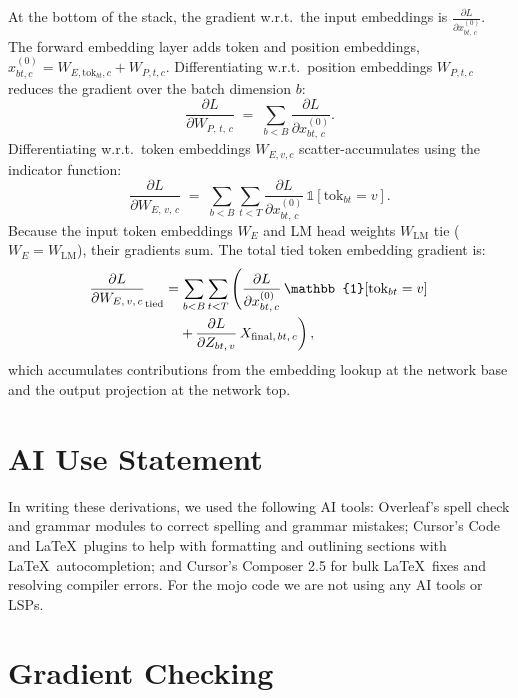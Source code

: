 \documentclass[letterpaper, 10 pt, conference]{ieeeconf}
\newcommand{\pdv}[2]{\frac{\partial #1}{\partial #2}}
\newcommand{\dL}[1]{\pdv{L}{#1}}
\newcommand{\ind}[1]{\mathbb{1}\!\left[#1\right]}
\theoremstyle{definition}
\begin{document}
At the bottom of the stack, the gradient w.r.t.\ the input embeddings is $\dL{x^{(0)}_{bt,\, c}}$. The forward embedding layer adds token and position embeddings, $x^{(0)}_{bt, c} = W_{E, \text{tok}_{bt}, c} + W_{P, t, c}$.
Differentiating w.r.t.\ position embeddings $W_{P, t, c}$ reduces the gradient over the batch dimension $b$:
\begin{equation}
  \dL{W_{P,\, t,\, c}} \;=\; \sum_{b<B} \dL{x^{(0)}_{bt,\, c}}.
  \label{eq:full-dwp}
\end{equation}
Differentiating w.r.t.\ token embeddings $W_{E, v, c}$ scatter-accumulates using the indicator function:
\begin{equation}
  \dL{W_{E,\, v,\, c}} \;=\; \sum_{b<B} \sum_{t<T} \dL{x^{(0)}_{bt,\, c}}\,\ind{\text{tok}_{bt} = v}.
  \label{eq:full-dwe}
\end{equation}
Because the input token embeddings $W_E$ and LM head weights $W_{\text{LM}}$ tie ($W_E = W_{\text{LM}}$), their gradients sum. The total tied token embedding gradient is:
\begin{align}
  \dL{W_{E,\, v,\, c}}_{\text{tied}}
   & = \sum_{b<B} \sum_{t<T} \left( \dL{x^{(0)}_{bt,\, c}}\,\ind{\text{tok}_{bt} = v} \right. \notag \\
   & \quad \left. + \, \dL{Z_{bt,\, v}}\,X_{\text{final},\, bt,\, c} \right),
  \label{eq:full-dwetied-expand}
\end{align}
which accumulates contributions from the embedding lookup at the network base and the output projection at the network top.

\section*{AI Use Statement}
In writing these derivations, we used the following AI tools: Overleaf's spell check and grammar modules to correct spelling and grammar mistakes; Cursor's Code and \LaTeX\ plugins to help with formatting and outlining sections with \LaTeX\ autocompletion; and Cursor's Composer 2.5 for bulk \LaTeX\ fixes and resolving compiler errors. For the mojo code we are not using any AI tools or LSPs.

\appendices
\section{Gradient Checking}\label{app:gradcheck}
\end{document}
